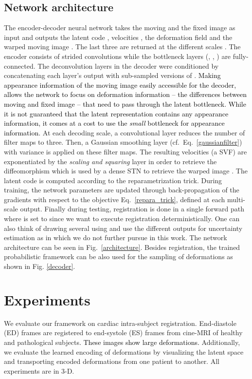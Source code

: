 \documentclass[journal]{IEEEtran}
\newcommand{\update}[1]{\textcolor{black}{#1}}
\begin{document}
\subsection{Network architecture}
The encoder-decoder neural network takes the moving and the fixed image as input and outputs the latent code , velocities , the deformation field  and the warped moving image . The last three are returned at the different scales . The encoder consists of strided convolutions while the bottleneck layers (, , ) are fully-connected. The deconvolution layers in the decoder were conditioned by concatenating each layer's output with sub-sampled versions of . \update{Making appearance information of the moving image easily accessible for the decoder, allows the network to focus on deformation information -- the differences between moving and fixed image -- that need to pass through the latent bottleneck. While it is not guaranteed that the latent representation contains any appearance information, it comes at a cost to use the \emph{small} bottleneck for appearance information.} At each decoding scale, a convolutional layer reduces the number of filter maps to three. Then, a Gaussian smoothing layer (cf.\ Eq.\ \ref{gaussianfilter}) with variance  is applied on these filter maps. The resulting velocities  (a SVF) are exponentiated by the \emph{scaling and squaring} layer \cite{krebs2018unsupervised} in order to retrieve the diffeomorphism  which is used by a dense STN to retrieve the warped image . The latent code  is computed according to the reparametrization trick. During training, the network parameters are updated through back-propagation of the gradients with respect to the objective Eq.\ \ref{repara_trick}, defined at each multi-scale output. Finally during testing, registration is done in a single forward path where  is set to  since we want to execute registration deterministically. One can also think of drawing several  using  and use the different outputs for uncertainty estimation as in \cite{dalca2018unsupervised} which we do not further pursue in this work. The network architecture can be seen in Fig.\ \ref{architecture}. Besides registration, the trained probabilistic framework can be also used for the sampling of deformations as shown in Fig. \ref{decoder}. 

\section{Experiments}
We evaluate our framework on cardiac intra-subject registration. End-diastole (ED) frames are registered to end-systole (ES) frames from cine-MRI of healthy and pathological subjects\update{. These images show large deformations.} Additionally, we evaluate the learned encoding of deformations by visualizing the latent space and transporting encoded deformations from one patient to another. All experiments are in 3-D. 
\end{document}
